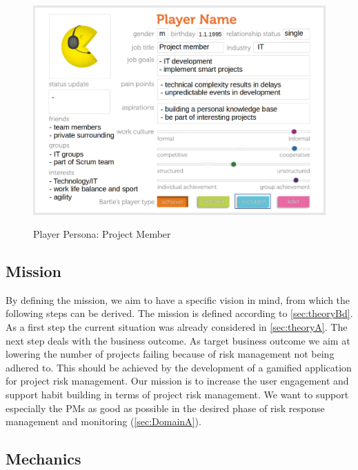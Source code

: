\begin{figure}[H]
	\centering
	\includegraphics[width=1.0\textwidth]{Content/Domain/PersonaProjectMember.png}
	\caption{Player Persona: Project Member}
	\label{fig:personaProjectMember}
	\cite[p. 88; adapted]{kumarGamificationWorkDesigning2013}
\end{figure}


\subsection{Mission}
\label{sec:domainCb}

By defining the mission, we aim to have a specific vision in mind, from which the following steps can be derived. The mission is defined according to \ref{sec:theoryBd}. 
As a first step the current situation was already considered in \ref{sec:theoryA}. The next step deals with the business outcome. As target business outcome we aim at lowering the number of projects failing because of risk management not being adhered to. This should be achieved by the development of a gamified application for project risk management.
Our mission is to increase the user engagement and support habit building in terms of project risk management. We want to support especially the PMs as good as possible in the desired phase of risk response management and monitoring (\ref{sec:DomainA}).

\subsection{Mechanics}
\label{sec:domainCc}

